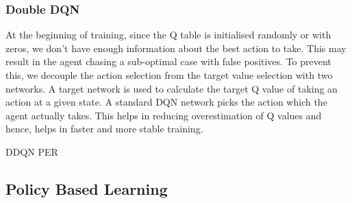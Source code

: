 \documentclass{article}
\begin{document}
\subsubsection{Double DQN}
At the beginning of training, since the Q table is initialised randomly or with zeros, we don't have enough information about the best action to take. This may result in the agent chasing a sub-optimal case with false positives. To prevent this, we decouple the action selection from the target value selection with two networks. A target network is used to calculate the target Q value of taking an action at a given state. A standard DQN network picks the action which the agent actually takes. This helps in reducing overestimation of Q values and hence, helps in faster and more stable training.

DDQN
PER

\subsection{Policy Based Learning}
\end{document}
